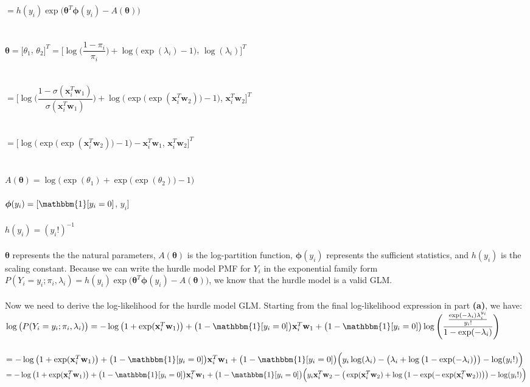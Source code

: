 \documentclass[submit]{harvardml}
\begin{document}
$=h(y_i)\exp\big(\bm{\theta}^T\bm{\phi}(y_i)-A(\bm{\theta})\big)$\\\\\\
$\bm{\theta}=[\theta_1$, $\theta_2]^T=\Bigg[\log\bigg(\dfrac{1-\pi_i}{\pi_i}\bigg)+\log\big(\exp(\lambda_i)-1\big)$, $\log(\lambda_i)\Bigg]^T$\\\\\\
$=\Bigg[\log\bigg(\dfrac{1-\sigma(\mathbf{x}_i^T\mathbf{w}_1)}{\sigma(\mathbf{x}_i^T\mathbf{w}_1)}\bigg)+\log\Big(\exp\big(\exp(\mathbf{x}_i^T\mathbf{w}_2)\big)-1\Big)$, $\mathbf{x}_i^T\mathbf{w}_2\Bigg]^T$\\\\\\
$=\bigg[\log\Big(\exp\big(\exp(\mathbf{x}_i^T\mathbf{w}_2)\big)-1\Big)-\mathbf{x}_i^T\mathbf{w}_1$, $\mathbf{x}_i^T\mathbf{w}_2\bigg]^T$\\\\\\
$A(\bm{\theta})=\log\Big(\exp(\theta_1)+\exp\big(\exp(\theta_2)\big)-1\Big)$\\\\
$\bm{\phi}(y_i)=[\mathbbm{1}[y_i=0]$, $y_i$]\\\\
$h(y_i)=(y_i!)^{-1}$\\\\
$\bm{\theta}$ represents the the natural parameters, $A(\bm{\theta})$ is the log-partition function, $\bm{\phi}(y_i)$ represents the sufficient statistics, and $h(y_i)$ is the scaling constant. Because we can write the hurdle model PMF for $Y_i$ in the exponential family form $P(Y_i=y_i;\pi_i,\lambda_i)=h(y_i)\exp\big(\bm{\theta}^T\bm{\phi}(y_i)-A(\bm{\theta})\big)$, we know that the hurdle model is a valid GLM.\\\\
Now we need to derive the log-likelihood for the hurdle model GLM. Starting from the final log-likelihood expression in part \textbf{(a)}, we have:\\
$\log\big(P(Y_i=y_i;\pi_i,\lambda_i)\big)=-\log\big(1+\exp(\mathbf{x}_i^T\mathbf{w}_1)\big)+\big(1-\mathbbm{1}[y_i=0]\big)\mathbf{x}_i^T\mathbf{w}_1+\big(1-\mathbbm{1}[y_i=0]\big)\log\Bigg(\dfrac{\frac{\exp(-\lambda_i)\lambda_i^{y_i}}{y_i!}}{1-\exp(-\lambda_i)}\Bigg)$\\\\
$=-\log\big(1+\exp(\mathbf{x}_i^T\mathbf{w}_1)\big)+\big(1-\mathbbm{1}[y_i=0]\big)\mathbf{x}_i^T\mathbf{w}_1+\big(1-\mathbbm{1}[y_i=0]\big)\Big(y_i\log(\lambda_i)-\big(\lambda_i+\log\big(1-\exp(-\lambda_i)\big)\big)-\log(y_i!)\Big)$
$=-\log\big(1+\exp(\mathbf{x}_i^T\mathbf{w}_1)\big)+\big(1-\mathbbm{1}[y_i=0]\big)\mathbf{x}_i^T\mathbf{w}_1+\big(1-\mathbbm{1}[y_i=0]\big)\Big(y_i\mathbf{x}_i^T\mathbf{w}_2-\big(\exp(\mathbf{x}_i^T\mathbf{w}_2)+\log\big(1-\exp(-\exp(\mathbf{x}_i^T\mathbf{w}_2))\big)\big)-\log(y_i!)\Big)$
\end{document}
